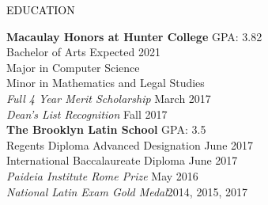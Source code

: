 \documentclass{resume} %
\renewenvironment{rSection}[1]{
\sectionskip
\textcolor{Black}{\MakeUppercase{#1}}
\sectionlineskip
\begin{list}{}{
\setlength{\leftmargin}{1.5em}
}
\item[]
}{
\end{list}
}
\begin{document}
\begin{rSection}{Education}
  \begin{multicols}{2}
    {\bf Macaulay Honors at Hunter College} \hfill GPA: 3.82
    \\ Bachelor of Arts \hfill Expected 2021
    \\ Major in Computer Science
    \\ Minor in Mathematics and Legal Studies
    \\ {\em Full 4 Year Merit Scholarship} \hfill March 2017
    \\ {\em Dean's List Recognition } \hfill Fall 2017\columnbreak
    \\ {\bf The Brooklyn Latin School} \hfill GPA: 3.5
    \\ Regents Diploma Advanced Designation \hfill June 2017
    \\ International Baccalaureate Diploma \hfill June 2017
    \\ {\em Paideia Institute Rome Prize} \hfill May 2016
    \\ {\em National Latin Exam Gold Medal}\hfill 2014, 2015, 2017
  \end{multicols}
\end{rSection}
\end{document}

